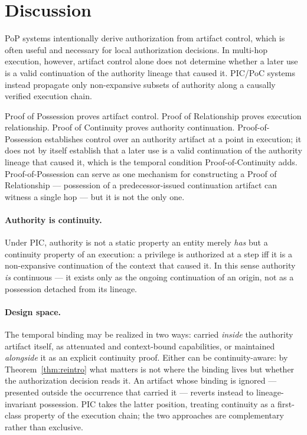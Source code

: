 \documentclass[11pt]{article}
\begin{document}
\section{Discussion}

PoP systems intentionally derive authorization from artifact control, which is
often useful and necessary for local authorization decisions. In multi-hop
execution, however, artifact control alone does not determine whether a later use
is a valid continuation of the authority lineage that caused it. PIC/PoC systems
instead propagate only non-expansive subsets of authority along a causally
verified execution chain.

Proof of Possession proves artifact control.
Proof of Relationship proves execution relationship.
Proof of Continuity proves authority continuation.
Proof-of-Possession establishes control over an authority artifact at a point in
execution; it does not by itself establish that a later use is a valid
continuation of the authority lineage that caused it, which is the temporal
condition Proof-of-Continuity adds. Proof-of-Possession can serve as one
mechanism for constructing a Proof of Relationship --- possession of a
predecessor-issued continuation artifact can witness a single hop --- but it is
not the only one.

\paragraph{Authority is continuity.}
Under PIC, authority is not a static property an entity merely \emph{has} but a
continuity property of an execution: a privilege is authorized at a step iff it is
a non-expansive continuation of the context that caused it. In this sense
authority \emph{is} continuous --- it exists only as the ongoing continuation of
an origin, not as a possession detached from its lineage.

\paragraph{Design space.}
The temporal binding may be realized in two ways: carried \emph{inside} the
authority artifact itself, as attenuated and context-bound capabilities, or
maintained \emph{alongside} it as an explicit continuity proof. Either can be
continuity-aware: by Theorem~\ref{thm:reintro} what matters is not where the
binding lives but whether the authorization decision reads it. An artifact whose
binding is ignored --- presented outside the occurrence that carried it ---
reverts instead to lineage-invariant possession. PIC takes the latter position,
treating continuity as a first-class property of the execution chain; the two
approaches are complementary rather than exclusive.
\end{document}
